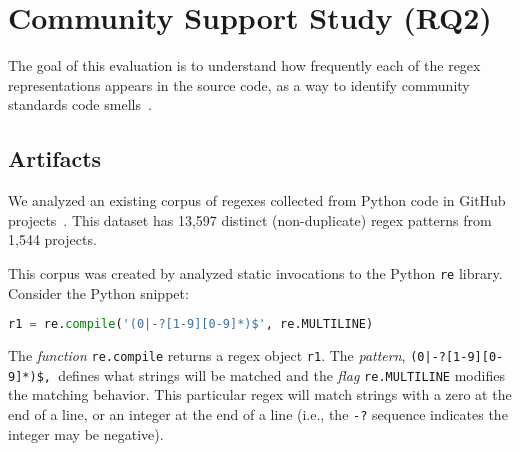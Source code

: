 
\section{Community Support Study (RQ2)}
\label{sec:rq2}
The goal of this evaluation is to understand how frequently each of the regex representations appears in the source code, as a way to identify community standards code smells~\cite{stoleeicse, stoleeTSE}. %



\subsection{Artifacts}
We analyzed an existing
corpus of regexes collected from Python code in GitHub projects~\cite{chapman2016}.
This dataset has 13,597 distinct (non-duplicate) regex patterns from 1,544 projects.

This corpus was created by analyzed static invocations to the Python {\tt re} library.
Consider the Python snippet:
\begin{lstlisting}[language=Python,firstnumber=1, basicstyle=\footnotesize]
r1 = re.compile('(0|-?[1-9][0-9]*)$', re.MULTILINE)
\end{lstlisting}
The \emph{function} {\tt re.compile} returns a regex object {\tt r1}.
The \emph{pattern}, \verb!(0|-?[1-9][0-9]*)$, !defines what strings will be matched and the \emph{flag} {\tt re.MULTILINE} modifies the matching behavior.
This particular regex will match strings with a zero at the end of a line, or an integer at the end of a line (i.e., the {\tt -?} sequence indicates the integer may be negative).


